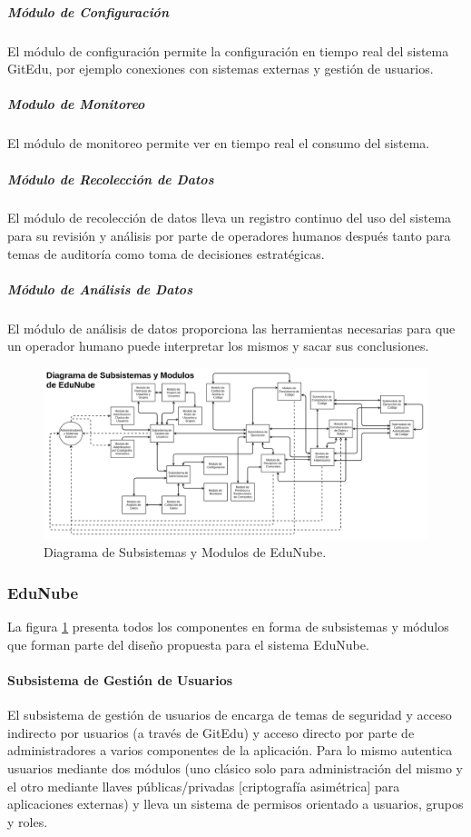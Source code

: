 \subparagraph{Módulo de Configuración}
El módulo de configuración permite la configuración en tiempo real del sistema GitEdu, por ejemplo conexiones con sistemas externas y gestión de usuarios.

\subparagraph{Modulo de Monitoreo}
El módulo de monitoreo permite ver en tiempo real el consumo del sistema.

\subparagraph{Módulo de Recolección de Datos}
El módulo de recolección de datos lleva un registro continuo del uso del sistema para su revisión y análisis por parte de operadores humanos después tanto para temas de auditoría como toma de decisiones estratégicas.

\subparagraph{Módulo de Análisis de Datos}
El módulo de análisis de datos proporciona las herramientas necesarias para que un operador humano puede interpretar los mismos y sacar sus conclusiones.

\pagebreak

\begin{landscape}

	\begin{figure}
	  \begin{center}
	    \includegraphics[width=1.7\textwidth]{Figures/mod_en.png}
	  \end{center}
	  \caption{Diagrama de Subsistemas y Modulos de EduNube.}
	  \label{mod_en}
	\end{figure}

\end{landscape}

\subsubsection{EduNube}

La figura \ref{mod_en} presenta todos los componentes en forma de subsistemas y módulos que forman parte del diseño propuesta para el sistema EduNube.

\paragraph{Subsistema de Gestión de Usuarios}
El subsistema de gestión de usuarios de encarga de temas de seguridad y acceso indirecto por usuarios (a través de GitEdu) y acceso directo por parte de administradores a varios componentes de la aplicación. Para lo mismo autentica usuarios mediante dos módulos (uno clásico solo para administración del mismo y el otro mediante llaves públicas/privadas [criptografía asimétrica] para aplicaciones externas) y lleva un sistema de permisos orientado a usuarios, grupos y roles.

